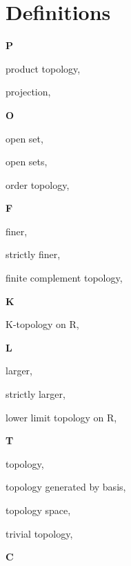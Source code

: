 \section*{Definitions}

\begin{multicols}{2}

\vspace{1em}\large{\textbf{P}}

product topology, \pageref{def:ProductTopology}

projection, \pageref{def:Projection}

\vspace{1em}\large{\textbf{O}}

open set, \pageref{def:OpenSet}

open sets, \pageref{def:OpenSets}

order topology, \pageref{def:OrderTopology}

\vspace{1em}\large{\textbf{F}}

finer, \pageref{def:Comparable}

\hspace{2em}strictly finer, \pageref{def:Comparable}

finite complement topology, \pageref{def:FiniteComplementTopology}

\vspace{1em}\large{\textbf{K}}

K-topology on R, \pageref{def:KTopologyOnTheRealLine}

\vspace{1em}\large{\textbf{L}}

larger, \pageref{def:Comparable}

\hspace{2em}strictly larger, \pageref{def:Comparable}

lower limit topology on R, \pageref{def:LowerLimitTopologyOnTheRealLine}

\vspace{1em}\large{\textbf{T}}

topology, \pageref{def:Topology}

topology generated by basis, \pageref{def:TopologyGeneratedByBasis}

topology space, \pageref{def:TopologySpace}

trivial topology, \pageref{def:TrivialTopology}

\vspace{1em}\large{\textbf{C}}


\end{multicols}
